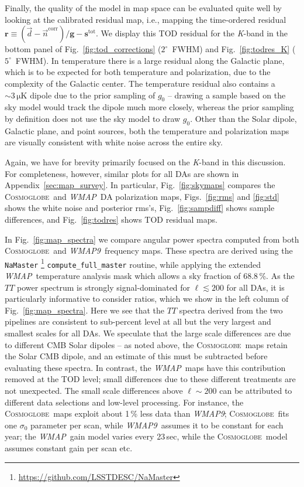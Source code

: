 \documentclass[twocolumn]{../../common/aa}
\def\WMAP{\emph{WMAP}}
\def\WMAPnine{\emph{WMAP9}}
\newcommand{\cosmoglobe}{\textsc{Cosmoglobe}}
\newcommand{\K}[0]{\textit K}
\newcommand{\ncorr}{\vec n^\mathrm{corr}}
\newcommand{\data}{\vec d}
\begin{document}
Finally, the quality of the model in map space can be evaluated quite well by looking at the calibrated residual map, i.e., mapping the time-ordered residual $\boldsymbol r\equiv(\data-\ncorr)/\boldsymbol g-\boldsymbol s^\mathrm{tot}$. We display this TOD residual for the \K-band in the bottom panel of Fig.~\ref{fig:tod_corrections} ($2^\circ$~FWHM) and Fig.~\ref{fig:todres_K} ($5^\circ$~FWHM). In temperature there is a large residual along the Galactic plane, which is to be expected for both temperature and polarization, due to the complexity of the Galactic center. The temperature residual also contains a $\sim3\,\mathrm{\mu K}$ dipole due to the prior sampling of $g_0$ -- drawing a sample based on the sky model would track the dipole much more closely, whereas the prior sampling by definition does not use the sky model to draw $g_0$. Other than the Solar dipole, Galactic plane, and point sources, both the temperature and polarization maps are visually consistent with white noise across the entire sky.

Again, we have for brevity primarily focused on the \K-band in this discussion. For completeness, however, similar plots for all DAs are shown in Appendix~\ref{sec:map_survey}. In particular, Fig.~\ref{fig:skymaps} compares the \cosmoglobe\ and \WMAP\ DA polarization maps, Figs.~\ref{fig:rms} and \ref{fig:std} shows the white noise and posterior rms's, Fig.~\ref{fig:sampdiff} shows sample differences, and Fig.~\ref{fig:todres} shows TOD residual maps.

In Fig.~\ref{fig:map_spectra} we compare angular power spectra computed from both  \cosmoglobe\ and \WMAPnine\ frequency maps. These spectra are derived using the \texttt{NaMaster} \citep{namaster}\footnote{\url{https://github.com/LSSTDESC/NaMaster}} \texttt{compute\_full\_master} routine, while applying the extended \WMAP\ temperature analysis mask which allows a sky fraction of 68.8\,\%. As the $TT$ power spectrum is strongly signal-dominated for $\ell\lesssim200$ for all DAs, it is particularly informative to consider ratios, which we show in the left column of Fig.~\ref{fig:map_spectra}. Here we see that the $TT$ spectra derived from the two pipelines are consistent to sub-percent level at all but the very largest and smallest scales for all DAs. We speculate that the large scale differences are due to different CMB Solar dipoles -- as noted above, the \cosmoglobe\ maps retain the Solar CMB dipole, and an estimate of this must be subtracted before evaluating these spectra. In contrast, the \WMAP\ maps have this contribution removed at the TOD level; small differences due to these different treatments are not unexpected. The small scale differences above $\ell\sim200$ can be attributed to different data selections and low-level processing. For instance, the \cosmoglobe\ maps exploit about 1\,\% less data than \WMAPnine; \cosmoglobe\ fits one $\sigma_0$ parameter per scan, while \WMAPnine\ assumes it to be constant for each year; the \WMAP\ gain model varies every 23\,sec, while the \cosmoglobe\ model assumes constant gain per scan etc.
\end{document}
